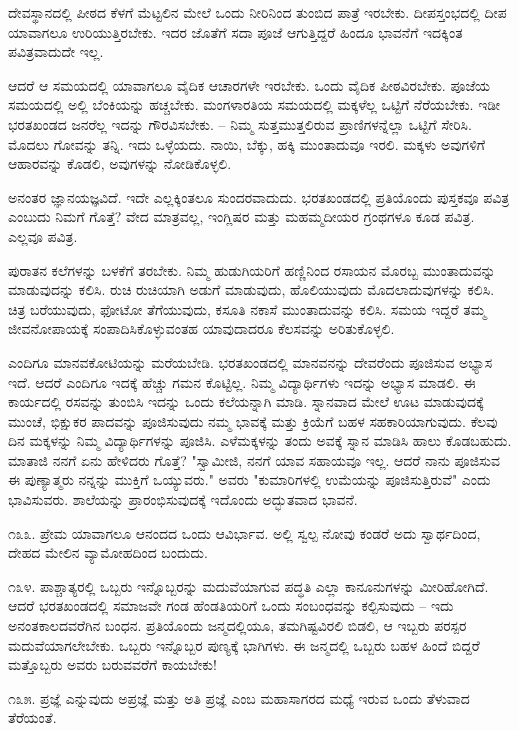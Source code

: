 ದೇವಸ್ಥಾನದಲ್ಲಿ ಪೀಠದ ಕೆಳಗೆ ಮೆಟ್ಟಲಿನ ಮೇಲೆ ಒಂದು ನೀರಿನಿಂದ ತುಂಬಿದ ಪಾತ್ರೆ ಇರಬೇಕು. ದೀಪಸ್ತಂಭದಲ್ಲಿ ದೀಪ ಯಾವಾಗಲೂ ಉರಿಯುತ್ತಿರಬೇಕು. ಇದರ ಜೊತೆಗೆ ಸದಾ ಪೂಜೆ ಆಗುತ್ತಿದ್ದರೆ ಹಿಂದೂ ಭಾವನೆಗೆ ಇದಕ್ಕಿಂತ ಪವಿತ್ರವಾದುದೇ ಇಲ್ಲ.

ಆದರೆ ಆ ಸಮಯದಲ್ಲಿ ಯಾವಾಗಲೂ ವೈದಿಕ ಆಚಾರಗಳೇ ಇರಬೇಕು. ಒಂದು ವೈದಿಕ ಪೀಠವಿರಬೇಕು. ಪೂಜೆಯ ಸಮಯದಲ್ಲಿ ಅಲ್ಲಿ ಬೆಂಕಿಯನ್ನು ಹಚ್ಚಬೇಕು. ಮಂಗಳಾರತಿಯ ಸಮಯದಲ್ಲಿ ಮಕ್ಕಳೆಲ್ಲ ಒಟ್ಟಿಗೆ ನೆರೆಯಬೇಕು. ಇಡೀ ಭರತಖಂಡದ ಜನರೆಲ್ಲ ಇದನ್ನು ಗೌರವಿಸಬೇಕು. – ನಿಮ್ಮ ಸುತ್ತಮುತ್ತಲಿರುವ ಪ್ರಾಣಿಗಳನ್ನೆಲ್ಲಾ ಒಟ್ಟಿಗೆ ಸೇರಿಸಿ. ಮೊದಲು ಗೋವನ್ನು ತನ್ನಿ. ಇದು ಒಳ್ಳೆಯದು. ನಾಯಿ, ಬೆಕ್ಕು, ಹಕ್ಕಿ ಮುಂತಾದುವೂ ಇರಲಿ. ಮಕ್ಕಳು ಅವುಗಳಿಗೆ ಆಹಾರವನ್ನು ಕೊಡಲಿ, ಅವುಗಳನ್ನು ನೋಡಿಕೊಳ್ಳಲಿ.

ಅನಂತರ ಜ್ಞಾನಯಜ್ಞವಿದೆ. ಇದೇ ಎಲ್ಲಕ್ಕಿಂತಲೂ ಸುಂದರವಾದುದು. ಭರತಖಂಡದಲ್ಲಿ ಪ್ರತಿಯೊಂದು ಪುಸ್ತಕವೂ ಪವಿತ್ರ ಎಂಬುದು ನಿಮಗೆ ಗೊತ್ತೆ? ವೇದ ಮಾತ್ರವಲ್ಲ, ಇಂಗ್ಲಿಷರ ಮತ್ತು ಮಹಮ್ಮದೀಯರ ಗ್ರಂಥಗಳೂ ಕೂಡ ಪವಿತ್ರ. ಎಲ್ಲವೂ ಪವಿತ್ರ.

ಪುರಾತನ ಕಲೆಗಳನ್ನು ಬಳಕೆಗೆ ತರಬೇಕು. ನಿಮ್ಮ ಹುಡುಗಿಯರಿಗೆ ಹಣ್ಣಿನಿಂದ ರಸಾಯನ ಮೊರಬ್ಬ ಮುಂತಾದುವನ್ನು ಮಾಡುವುದನ್ನು ಕಲಿಸಿ. ರುಚಿ ರುಚಿಯಾಗಿ ಅಡುಗೆ ಮಾಡುವುದು, ಹೊಲಿಯುವುದು ಮೊದಲಾದುವುಗಳನ್ನು ಕಲಿಸಿ. ಚಿತ್ರ ಬರೆಯುವುದು, ಫೋಟೋ ತೆಗೆಯುವುದು, ಕಸೂತಿ ನಕಾಸೆ ಮುಂತಾದುವನ್ನು ಕಲಿಸಿ. ಸಮಯ ಇದ್ದರೆ ತಮ್ಮ ಜೀವನೋಪಾಯಕ್ಕೆ ಸಂಪಾದಿಸಿಕೊಳ್ಳುವಂತಹ ಯಾವುದಾದರೂ ಕೆಲಸವನ್ನು ಅರಿತುಕೊಳ್ಳಲಿ.

ಎಂದಿಗೂ ಮಾನವಕೋಟಿಯನ್ನು ಮರೆಯಬೇಡಿ. ಭರತಖಂಡದಲ್ಲಿ ಮಾನವನನ್ನು ದೇವರೆಂದು ಪೂಜಿಸುವ ಅಭ್ಯಾಸ ಇದೆ. ಆದರೆ ಎಂದಿಗೂ ಇದಕ್ಕೆ ಹೆಚ್ಚು ಗಮನ ಕೊಟ್ಟಿಲ್ಲ. ನಿಮ್ಮ ವಿದ್ಯಾರ್ಥಿಗಳು ಇದನ್ನು ಅಭ್ಯಾಸ ಮಾಡಲಿ. ಈ ಕಾರ್ಯದಲ್ಲಿ ರಸವನ್ನು ತುಂಬಿಸಿ ಇದನ್ನು ಒಂದು ಕಲೆಯನ್ನಾಗಿ ಮಾಡಿ. ಸ್ನಾನವಾದ ಮೇಲೆ ಊಟ ಮಾಡುವುದಕ್ಕೆ ಮುಂಚೆ, ಭಿಕ್ಷುಕರ ಪಾದವನ್ನು ಪೂಜಿಸುವುದು ನಮ್ಮ ಭಾವಕ್ಕೆ ಮತ್ತು ಕ್ರಿಯೆಗೆ ಬಹಳ ಸಹಕಾರಿಯಾಗುವುದು. ಕೆಲವು ದಿನ ಮಕ್ಕಳನ್ನು ನಿಮ್ಮ ವಿದ್ಯಾರ್ಥಿಗಳನ್ನು ಪೂಜಿಸಿ. ಎಳೆಮಕ್ಕಳನ್ನು ತಂದು ಅವಕ್ಕೆ ಸ್ನಾನ ಮಾಡಿಸಿ ಹಾಲು ಕೊಡಬಹುದು. ಮಾತಾಜಿ ನನಗೆ ಏನು ಹೇಳಿದರು ಗೊತ್ತೆ? "ಸ್ವಾಮೀಜಿ, ನನಗೆ ಯಾವ ಸಹಾಯವೂ ಇಲ್ಲ. ಆದರೆ ನಾನು ಪೂಜಿಸುವ ಈ ಪುಣ್ಯಾತ್ಮರು ನನ್ನನ್ನು ಮುಕ್ತಿಗೆ ಒಯ್ಯುವರು." ಅವರು "ಕುಮಾರಿಗಳಲ್ಲಿ ಉಮೆಯನ್ನು ಪೂಜಿಸುತ್ತಿರುವೆ" ಎಂದು ಭಾವಿಸುವರು. ಶಾಲೆಯನ್ನು ಪ್ರಾರಂಭಿಸುವುದಕ್ಕೆ ಇದೊಂದು ಅದ್ಭುತವಾದ ಭಾವನೆ.

೧೩೩. ಪ್ರೇಮ ಯಾವಾಗಲೂ ಆನಂದದ ಒಂದು ಆವಿರ್ಭಾವ. ಅಲ್ಲಿ ಸ್ವಲ್ಪ ನೋವು ಕಂಡರೆ ಅದು ಸ್ವಾರ್ಥದಿಂದ, ದೇಹದ ಮೇಲಿನ ವ್ಯಾಮೋಹದಿಂದ ಬಂದುದು.

೧೩೪. ಪಾಶ್ಚಾತ್ಯರಲ್ಲಿ ಒಬ್ಬರು ಇನ್ನೊಬ್ಬರನ್ನು ಮದುವೆಯಾಗುವ ಪದ್ಧತಿ ಎಲ್ಲಾ ಕಾನೂನುಗಳನ್ನು ಮೀರಿಹೋಗಿದೆ. ಆದರೆ ಭರತಖಂಡದಲ್ಲಿ ಸಮಾಜವೇ ಗಂಡ ಹೆಂಡತಿಯರಿಗೆ ಒಂದು ಸಂಬಂಧವನ್ನು ಕಲ್ಪಿಸುವುದು – ಇದು ಅನಂತಕಾಲದವರೆಗಿನ ಬಂಧನ. ಪ್ರತಿಯೊಂದು ಜನ್ಮದಲ್ಲಿಯೂ, ತಮಗಿಷ್ಟವಿರಲಿ ಬಿಡಲಿ, ಆ ಇಬ್ಬರು ಪರಸ್ಪರ ಮದುವೆಯಾಗಲೇಬೇಕು. ಒಬ್ಬರು ಇನ್ನೊಬ್ಬರ ಪುಣ್ಯಕ್ಕೆ ಭಾಗಿಗಳು. ಈ ಜನ್ಮದಲ್ಲಿ ಒಬ್ಬರು ಬಹಳ ಹಿಂದೆ ಬಿದ್ದರೆ ಮತ್ತೊಬ್ಬರು ಅವರು ಬರುವವರೆಗೆ ಕಾಯಬೇಕು!

೧೩೫. ಪ್ರಜ್ಞೆ ಎನ್ನುವುದು ಅಪ್ರಜ್ಞೆ  ಮತ್ತು ಅತಿ ಪ್ರಜ್ಞೆ  ಎಂಬ ಮಹಾಸಾಗರದ ಮಧ್ಯೆ ಇರುವ ಒಂದು ತೆಳುವಾದ ತೆರೆಯಂತೆ.

